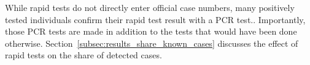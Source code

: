 While rapid tests do not directly enter official case numbers, many positively tested
individuals confirm their rapid test result with a PCR test.. Importantly,
those PCR tests are made in addition to the tests that would have been done otherwise.
Section~\ref{subsec:results_share_known_cases} discusses the effect of rapid tests on
the share of detected cases.
